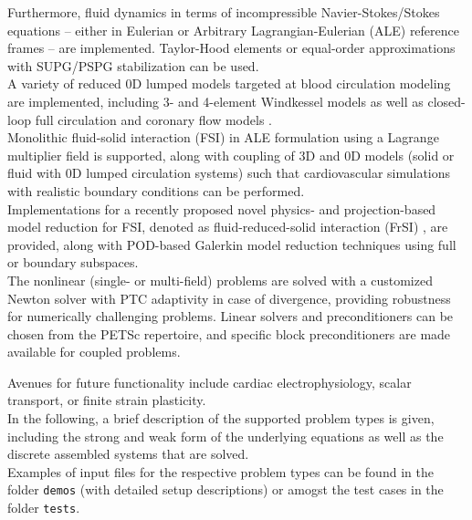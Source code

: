 \documentclass[a4paper,12pt]{report}
\begin{document}
Furthermore, fluid dynamics in terms of incompressible Navier-Stokes/Stokes equations -- either in Eulerian or Arbitrary Lagrangian-Eulerian (ALE) reference frames -- are implemented. Taylor-Hood elements or equal-order approximations with SUPG/PSPG stabilization \cite{tezduyar2000} can be used.\\

A variety of reduced 0D lumped models targeted at blood circulation modeling are implemented, including 3- and 4-element Windkessel models \cite{westerhof2009} as well as closed-loop full circulation \cite{hirschvogel2017} and coronary flow models \cite{arthurs2016}.\\

Monolithic fluid-solid interaction (FSI) \cite{nordsletten2011} in ALE formulation using a Lagrange multiplier field is supported, along with coupling of 3D and 0D models (solid or fluid with 0D lumped circulation systems) such that cardiovascular simulations with realistic boundary conditions can be performed.\\

Implementations for a recently proposed novel physics- and projection-based model reduction for FSI, denoted as fluid-reduced-solid interaction (FrSI) \cite{hirschvogel2022preprint}, are provided, along with POD-based Galerkin model reduction techniques \cite{farhat2014} using full or boundary subspaces.\\

The nonlinear (single- or multi-field) problems are solved with a customized Newton solver with PTC \cite{gee2009} adaptivity in case of divergence, providing robustness for numerically challenging problems. Linear solvers and preconditioners can be chosen from the PETSc repertoire, and specific block preconditioners are made available for coupled problems.

Avenues for future functionality include cardiac electrophysiology, scalar transport, or finite strain plasticity.\\

In the following, a brief description of the supported problem types is given, including the strong and weak form of the underlying equations as well as the discrete assembled systems that are solved.\\

Examples of input files for the respective problem types can be found in the folder \verb"demos" (with detailed setup descriptions) or amogst the test cases in the folder \verb"tests".\\
\end{document}
